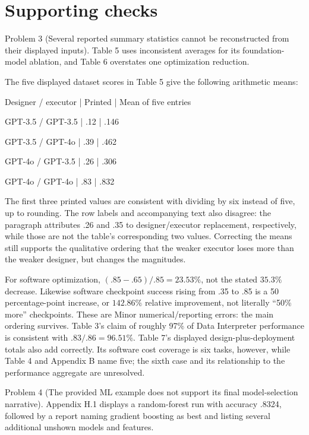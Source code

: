 \documentclass[10pt]{article}
\begin{document}
\section*{Supporting checks}
Problem 3 (Several reported summary statistics cannot be reconstructed from their displayed inputs).  Table 5 uses inconsistent averages for its foundation-model ablation, and Table 6 overstates one optimization reduction.\par
The five displayed dataset scores in Table 5 give the following arithmetic means:\par
Designer / executor | Printed | Mean of five entries\par
GPT-3.5 / GPT-3.5 | .12 | .146\par
GPT-3.5 / GPT-4o | .39 | .462\par
GPT-4o / GPT-3.5 | .26 | .306\par
GPT-4o / GPT-4o | .83 | .832\par
The first three printed values are consistent with dividing by six instead of five, up to rounding. The row labels and accompanying text also disagree: the paragraph attributes .26 and .35 to designer/executor replacement, respectively, while those are not the table’s corresponding two values. Correcting the means still supports the qualitative ordering that the weaker executor loses more than the weaker designer, but changes the magnitudes.\par
For software optimization, \((.85-.65)/.85=23.53\%\), not the stated \(35.3\%\) decrease. Likewise software checkpoint success rising from .35 to .85 is a 50 percentage-point increase, or \(142.86\%\) relative improvement, not literally “50\% more” checkpoints. These are Minor numerical/reporting errors: the main ordering survives. Table 3’s claim of roughly 97\% of Data Interpreter performance is consistent with \(.83/.86=96.51\%\). Table 7’s displayed design-plus-deployment totals also add correctly. Its software cost coverage is six tasks, however, while Table 4 and Appendix B name five; the sixth case and its relationship to the performance aggregate are unresolved.\par
Problem 4 (The provided ML example does not support its final model-selection narrative).  Appendix H.1 displays a random-forest run with accuracy .8324, followed by a report naming gradient boosting as best and listing several additional unshown models and features.\par
\end{document}
